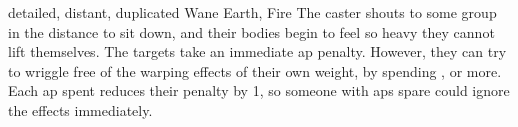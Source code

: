   {detailed, distant, duplicated}%
  {Wane}%
  {Earth, Fire}%
  {}%
  {
    The caster shouts to some group in the distance to sit down, and their bodies begin to feel so heavy they cannot lift themselves.
    The targets take an immediate  \gls{ap} penalty.
    However, they can try to wriggle free of the warping effects of their own weight, by spending , or more.
    Each \gls{ap} spent reduces their penalty by 1, so someone with  \glspl{ap} spare could ignore the effects immediately.
  }%
  {}

